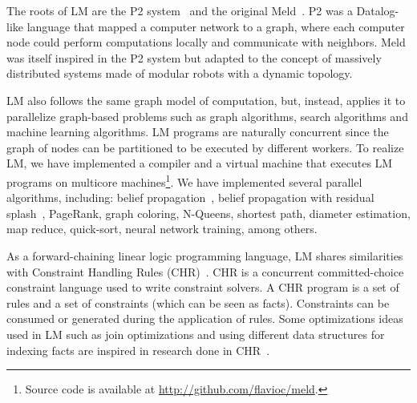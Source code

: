 The roots of LM are the P2 system~\cite{Loo-condie-garofalakis-p2} and the original Meld~\cite{ashley-rollman-derosa-iros07wksp,ashley-rollman-iclp09}.
P2 was a Datalog-like language that mapped a computer network
to a graph, where each computer node could perform computations locally and communicate with neighbors.
Meld was itself inspired in the P2 system but adapted to the concept of massively distributed systems
made of modular robots with a dynamic topology.

LM also follows the same graph model of computation, but, instead, applies it to parallelize graph-based problems such as
graph algorithms, search algorithms and machine learning algorithms. LM programs are naturally concurrent since the graph of nodes
can be partitioned to be executed by different workers.
To realize LM, we have implemented a compiler and a virtual machine that executes LM programs on multicore machines\footnote{Source code is available at \url{http://github.com/flavioc/meld}.}.
We have implemented several parallel algorithms, including: belief propagation~\cite{Gonzalez+al:aistats09paraml},
belief propagation with residual splash~\cite{Gonzalez+al:aistats09paraml}, PageRank, graph coloring,
N-Queens, shortest path, diameter estimation, map reduce, quick-sort, neural network training, among others.

\iffalse
There are also non logical based systems intended to solve graph-based problems such as Dryad, Pregel or GraphLab.
The Dryad system~\cite{Isard:2007:DDD:1272996.1273005} is a framework that combines computational vertices
with communication channels (edges) to form a data-flow graph. 
The Pregel system~\cite{Malewicz:2010:PSL:1807167.1807184} is also graph-based, although programs must be represented
as a sequence of iterations where each iteration is composed of computation and message passing.
Finally, GraphLab~\cite{GraphLab2010} is a library for developing parallel (graph-based) machine learning algorithms in C++
and provides several schedulers to dictate the order of node execution.
\fi

As a forward-chaining linear logic programming language, LM shares similarities with Constraint Handling Rules (CHR)~\cite{Betz:2005kx,DBLP:journals/corr/abs-1006-3039}.
CHR is a concurrent committed-choice constraint language used to write constraint solvers. A CHR program is a set of rules and
a set of constraints (which can be seen as facts). Constraints can be consumed or generated during the application of rules.
Some optimizations ideas used in LM such as join optimizations and using different data structures for indexing facts
are inspired in research done in CHR~\cite{DBLP:journals/corr/cs-PL-0408025}.



